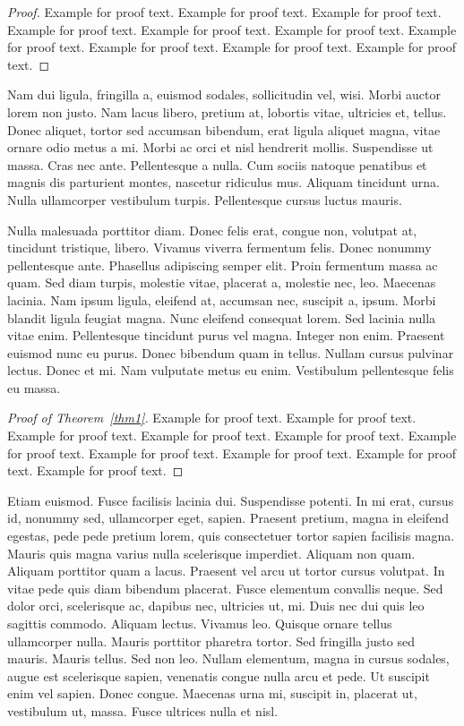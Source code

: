 \documentclass[APA,STIX1COL]{WileyNJD-v2}
\begin{document}
\begin{proof}
Example for proof text. Example for proof text. Example for proof text. Example for proof text. Example for proof text. Example for proof text. Example for proof text. Example for proof text. Example for proof text. Example for proof text. 
\end{proof}

Nam dui ligula, fringilla a, euismod sodales, sollicitudin vel, wisi. Morbi auctor lorem non justo. Nam lacus libero,
pretium at, lobortis vitae, ultricies et, tellus. Donec aliquet, tortor sed accumsan bibendum, erat ligula aliquet magna,
vitae ornare odio metus a mi. Morbi ac orci et nisl hendrerit mollis. Suspendisse ut massa. Cras nec ante. Pellentesque
a nulla. Cum sociis natoque penatibus et magnis dis parturient montes, nascetur ridiculus mus. Aliquam tincidunt
urna. Nulla ullamcorper vestibulum turpis. Pellentesque cursus luctus mauris.

Nulla malesuada porttitor diam. Donec felis erat, congue non, volutpat at, tincidunt tristique, libero. Vivamus
viverra fermentum felis. Donec nonummy pellentesque ante. Phasellus adipiscing semper elit. Proin fermentum massa
ac quam. Sed diam turpis, molestie vitae, placerat a, molestie nec, leo. Maecenas lacinia. Nam ipsum ligula, eleifend
at, accumsan nec, suscipit a, ipsum. Morbi blandit ligula feugiat magna. Nunc eleifend consequat lorem. Sed lacinia
nulla vitae enim. Pellentesque tincidunt purus vel magna. Integer non enim. Praesent euismod nunc eu purus. Donec
bibendum quam in tellus. Nullam cursus pulvinar lectus. Donec et mi. Nam vulputate metus eu enim. Vestibulum
pellentesque felis eu massa.

\begin{proof}[Proof of Theorem~\ref{thm1}]
Example for proof text. Example for proof text. Example for proof text. Example for proof text. Example for proof text. Example for proof text. Example for proof text. Example for proof text. Example for proof text. Example for proof text. 
\end{proof}

Etiam euismod. Fusce facilisis lacinia dui. Suspendisse potenti. In mi erat, cursus id, nonummy sed, ullamcorper
eget, sapien. Praesent pretium, magna in eleifend egestas, pede pede pretium lorem, quis consectetuer tortor sapien
facilisis magna. Mauris quis magna varius nulla scelerisque imperdiet. Aliquam non quam. Aliquam porttitor quam
a lacus. Praesent vel arcu ut tortor cursus volutpat. In vitae pede quis diam bibendum placerat. Fusce elementum
convallis neque. Sed dolor orci, scelerisque ac, dapibus nec, ultricies ut, mi. Duis nec dui quis leo sagittis commodo.
Aliquam lectus. Vivamus leo. Quisque ornare tellus ullamcorper nulla. Mauris porttitor pharetra tortor. Sed fringilla
justo sed mauris. Mauris tellus. Sed non leo. Nullam elementum, magna in cursus sodales, augue est scelerisque
sapien, venenatis congue nulla arcu et pede. Ut suscipit enim vel sapien. Donec congue. Maecenas urna mi, suscipit
in, placerat ut, vestibulum ut, massa. Fusce ultrices nulla et nisl.
\end{document}

